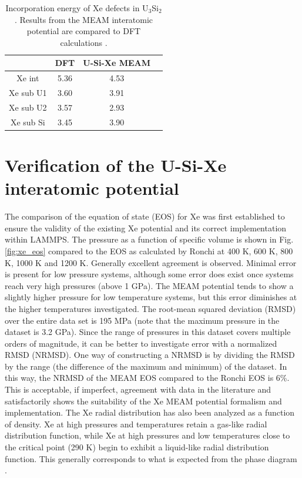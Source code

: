\documentclass[review]{elsarticle}
\begin{document}
\begin{table}[h]
\caption{Incorporation energy of Xe defects in U$_3$Si$_2$. Results from the MEAM interatomic potential are compared to DFT calculations \cite{andersson2018}. }\label{tab:xeinc}
\begin{center}
\begin{tabular}{|c|c|c|c|}
 \hline
 & DFT & U-Si-Xe MEAM \\
 \hline
 Xe int & 5.36 & 4.53 \\ 
 Xe sub U1 & 3.60 & 3.91 \\ 
 Xe sub U2 & 3.57 & 2.93 \\ 
 Xe sub Si & 3.45 & 3.90 \\ 
 \hline
\end{tabular}
\end{center}
\label{default}
\end{table}%

\FloatBarrier

\section{Verification of the U-Si-Xe interatomic potential}

The comparison of the equation of state (EOS) for Xe was first established to ensure the validity of the existing Xe potential and its correct implementation within LAMMPS. The pressure as a function of specific volume is shown in Fig. \ref{fig:xe_eos} compared to the EOS as calculated by Ronchi \cite{ronchi1981} at 400 K, 600 K, 800 K, 1000 K and 1200 K. Generally excellent agreement is observed. Minimal error is present for low pressure systems, although some error does exist once systems reach very high pressures (above 1 GPa). The MEAM potential tends to show a slightly higher pressure for low temperature systems, but this error diminishes at the higher temperatures investigated. The root-mean squared deviation (RMSD) over the entire data set is 195 MPa (note that the maximum pressure in the dataset is 3.2 GPa). Since the range of pressures in this dataset covers multiple orders of magnitude, it can be better to investigate error with a normalized RMSD (NRMSD). One way of constructing a NRMSD is by dividing the RMSD by the range (the difference of the maximum and minimum) of the dataset. In this way, the NRMSD of the MEAM EOS compared to the Ronchi EOS is 6\%. This is acceptable, if imperfect, agreement with data in the literature and satisfactorily shows the suitability of the Xe MEAM potential formalism and implementation. The Xe radial distribution has also been analyzed as a function of density. Xe at high pressures and temperatures retain a gas-like radial distribution function, while Xe at high pressures and low temperatures close to the critical point (290 K) begin to exhibit a liquid-like radial distribution function. This generally corresponds to what is expected from the phase diagram \cite{cook1961}.
\end{document}
